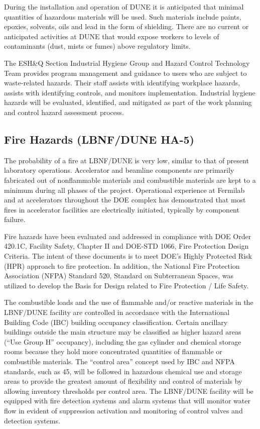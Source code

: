During the installation and operation of DUNE it is anticipated that
minimal quantities of hazardous materials will be used. Such materials
include paints, epoxies, solvents, oils and lead in the form of
shielding. There are no current or anticipated activities at DUNE that
would expose workers to levels of contaminants (dust, mists or fumes)
above regulatory limits.

The ESH\&Q Section Industrial Hygiene Group and Hazard Control
Technology Team provides program management and guidance to users who
are subject to waste-related hazards.  Their staff assists with
identifying workplace hazards, assists with identifying controls, and
monitors implementation. Industrial hygiene hazards will be evaluated,
identified, and mitigated as part of the work planning and control
hazard assessment process.

\subsection{Fire Hazards (LBNF/DUNE HA-5)}

The probability of a fire at LBNF/DUNE is very low, similar to that of
present laboratory operations. Accelerator and beamline components are
primarily fabricated out of nonflammable materials and combustible
materials are kept to a minimum during all phases of the
project. Operational experience at Fermilab and at accelerators
throughout the DOE complex has demonstrated that most fires in
accelerator facilities are electrically initiated, typically by
component failure.

Fire hazards have been evaluated and addressed in compliance with DOE
Order 420.1C, Facility Safety, Chapter II and DOE-STD 1066, Fire
Protection Design Criteria.  The intent of these documents is to meet
DOE’s Highly Protected Risk (HPR) approach to fire protection.  In
addition, the National Fire Protection Association (NFPA) Standard
520, Standard on Subterranean Spaces, was utilized to develop the
Basis for Design related to Fire Protection / Life Safety.

The combustible loads and the use of flammable and/or reactive
materials in the LBNF/DUNE facility are controlled in accordance with
the International Building Code (IBC) building occupancy
classification. Certain ancillary buildings outside the main structure
may be classified as higher hazard areas (“Use Group H” occupancy),
including the gas cylinder and chemical storage rooms because they
hold more concentrated quantities of flammable or combustible
materials.  The “control area” concept used by IBC and NFPA standards,
such as 45, will be followed in hazardous chemical use and storage
areas to provide the greatest amount of flexibility and control of
materials by allowing inventory thresholds per control area.  The
LBNF/DUNE facility will be equipped with fire detection systems and
alarm systems that will monitor water flow in evident of suppression
activation and monitoring of control valves and detection systems.

